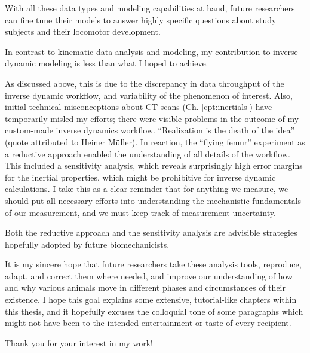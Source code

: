 With all these data types and modeling capabilities at hand, future researchers can fine tune their models to answer highly specific questions about study subjects and their locomotor development.


In contrast to kinematic data analysis and modeling, my contribution to inverse dynamic modeling is less than what I hoped to achieve.

As discussed above, this is due to the discrepancy in data throughput of the inverse dynamic workflow, and variability of the phenomenon of interest.
Also, initial technical misconceptions about CT scans (Ch. \ref{cpt:inertials}) have temporarily misled my efforts; there were visible problems in the outcome of my custom-made inverse dynamics workflow.
``Realization is the death of the idea'' (quote attributed to Heiner Müller).
In reaction, the ``flying femur'' experiment as a reductive approach enabled the understanding of all details of the workflow.
This included a sensitivity analysis, which reveals surprisingly high error margins for the inertial properties, which might be prohibitive for inverse dynamic calculations.
I take this as a clear reminder that for anything we measure, we should put all necessary efforts into understanding the mechanistic fundamentals of our measurement, and we must keep track of measurement uncertainty.

Both the reductive approach and the sensitivity analysis are advisible strategies hopefully adopted by future biomechanicists.


It is my sincere hope that future researchers take these analysis tools, reproduce, adapt, and correct them where needed, and improve our understanding of how and why various animals move in different phases and circumstances of their existence.
I hope this goal explains some extensive, tutorial-like chapters within this thesis, and it hopefully excuses the colloquial tone of some paragraphs which might not have been to the intended entertainment or taste of every recipient.
\bigskip


Thank you for your interest in my work!
